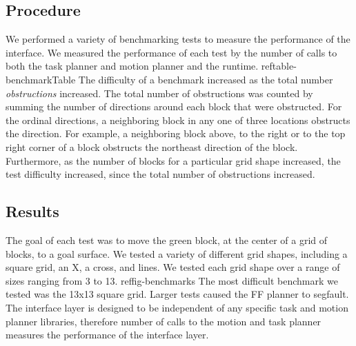\documentclass[12pt]{article}
\begin{document}
\subsection{Procedure}

We performed a variety of benchmarking tests to measure the performance of the interface. We measured the performance of each test by the number of calls to both the task planner and motion planner and the runtime. ref{table-benchmarkTable}
The difficulty of a benchmark increased as the total number \textit{obstructions} increased. The total number of obstructions was counted by summing the number of directions around each block that were obstructed. For the ordinal directions, a neighboring block in any one of three locations obstructs the direction. For example, a neighboring block above, to the right or to the top right corner of a block obstructs the northeast direction of the block. Furthermore, as the number of blocks for a particular grid shape increased, the test difficulty increased, since the total number of obstructions increased.

\subsection{Results}
The goal of each test was to move the green block, at the center of a grid of blocks, to a goal surface. We tested a variety of different grid shapes, including a square grid, an X, a cross, and lines. We tested each grid shape over a range of sizes ranging from 3 to 13. ref{fig-benchmarks} The most difficult benchmark we tested was the 13x13 square grid. Larger tests caused the FF planner to segfault.
The interface layer is designed to be independent of any specific task and motion planner libraries, therefore number of calls to the motion and task planner measures the performance of the interface layer.
\end{document}
